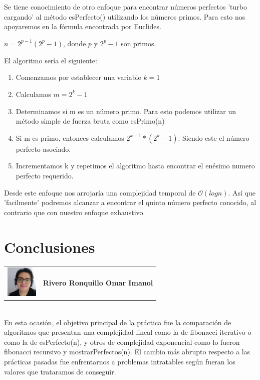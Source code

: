 \documentclass{report}
\begin{document}
        Se tiene conocimiento de otro enfoque para encontrar números perfectos 'turbo cargando' al método esPerfecto() utilizando los números primos. Para esto nos apoyaremos en la fórmula encontrada por Euclides.\\
        \begin{center}
            $n = 2^{p-1}(2^{p}-1)$, donde $p$ y $2^{p}-1$ son primos.\\
        \end{center}
        El algoritmo sería el siguiente:
        \begin{enumerate}
            \item Comenzamos por establecer una variable $k=1$
            \item Calculamos $m=2^{k}-1$
            \item Determinamos si m es un número primo. Para esto podemos utilizar un método simple de fuerza bruta como esPrimo(n)
            \item Si m es primo, entonces calculamos $2^{k-1}*(2^{k}-1)$. Siendo este el número perfecto asociado.
            \item Incrementamos k y repetimos el algoritmo hasta encontrar el enésimo numero perfecto requerido.
        \end{enumerate}
        
        Desde este enfoque nos arrojaría una complejidad temporal de $\mathcal{O}(logn)$. Así que 'facilmente' podremos alcanzar a encontrar el quinto número perfecto conocido, al contrario que con nuestro enfoque exhaustivo.
        
\section*{Conclusiones}
    \begin{tabular}{l l}
        \multirow{3}{*}{\includegraphics[width=1.5cm]{Imagenes/imanol.jpg}} &  \\
        & \textbf{Rivero Ronquillo Omar Imanol}\\
        & \\
    \end{tabular}
    \vspace*{3\baselineskip}\\
    En esta ocasión, el objetivo principal de la práctica fue la comparación de algoritmos que presentan una complejidad lineal como la de fibonacci iterativo o como la de esPerfecto(n), y otros de complejidad exponencial como lo fueron fibonacci recursivo y mostrarPerfectos(n). El cambio más abrupto respecto a las prácticas pasadas fue enfrentarnos a problemas intratables según fueran los valores que trataramos de conseguir.\\
    
\end{document}
